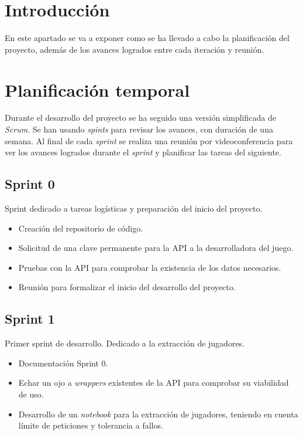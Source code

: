 
\section{Introducción}

En este apartado se va a exponer como se ha llevado a cabo la planificación del proyecto, además de los avances logrados entre cada iteración y reunión.

\section{Planificación temporal}

Durante el desarrollo del proyecto se ha seguido una versión simplificada de \textit{Scrum}. Se han usando \textit{spints} para revisar los avances, con duración de una semana. Al final de cada \textit{sprint} se realiza una reunión por videoconferencia para ver los avances logrados durante el \textit{sprint} y planificar las tareas del siguiente.

\subsection{Sprint 0}

Sprint dedicado a tareas logísticas y preparación del inicio del proyecto.

\begin{itemize}
    \item Creación del repositorio de código.
    \item Solicitud de una clave permanente para la API a la desarrolladora del juego.
    \item Pruebas con la API para comprobar la existencia de los datos necesarios.
    \item Reunión para formalizar el inicio del desarrollo del proyecto.
\end{itemize}

\subsection{Sprint 1}

Primer sprint de desarrollo. Dedicado a la extracción de jugadores.

\begin{itemize}
    \item Documentación Sprint 0.
    \item Echar un ojo a \textit{wrappers} existentes de la API para comprobar su viabilidad de uso.
    \item Desarrollo de un \textit{notebook} para la extracción de jugadores, teniendo en cuenta límite de peticiones y tolerancia a fallos.
\end{itemize}

